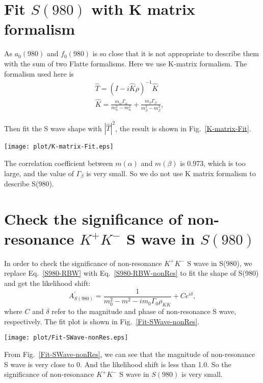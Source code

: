\section{Fit $S(980)$ with K matrix formalism}
\label{app:a0_f0_K_matrix}
{
    As $a_{0}(980)$ and $f_{0}(980)$ is so close that it is not appropriate to describe them with the sum of two Flatte formalisms.
    Here we use K-matrix formalism. 
    The formalism used here is
    \begin{equation}
        \begin{array}{lr}
            \hat{T} = (I - i\hat{K}\rho)^{-1} \hat{K}&\\
            \hat{K} = \frac{m_{\alpha}\Gamma_{\alpha}}{m_{\alpha}^{2} - m_{\alpha}^{2}} + \frac{m_{\beta}\Gamma_{\beta}}{m_{\beta}^{2} - m_{\beta}^{2}}, &
        \end{array}\label{K-matrix} 
    \end{equation}

    Then fit the S wave shape with $|\hat{T}|^{2}$, the result is shown in Fig.~\ref{K-matrix-Fit}.

    \begin{figure*}[htbp]
        \centering
        \texttt{[image: plot/K-matrix-Fit.eps]}
        \caption{Fit $S(980)$ with $|\hat{T}|^{2}$.}
        \label{K-matrix-Fit}
    \end{figure*}
    The correlation coefficient between $m(\alpha)$ and $m(\beta)$ is 0.973, which is too large, and the value of $\Gamma_{\beta}$ is very small.
    So we do not use K matrix formalism to describe S(980).
    
}

\section{Check the significance of non-resonance $K^{+}K^{-}$ S wave in $S(980)$}
\label{app:a0_f0_nonRes}
{
    In order to check the significance of non-resonance $K^{+}K^{-}$ S wave in S(980), we replace Eq.~\ref{S980-RBW} with Eq.~\ref{S980-RBW-nonRes} to fit the shape of S(980) and get the likelihood shift: 
    \begin{equation}
        A_{S(980)}^{'} = \frac{1}{m_{0}^{2} - m^{2} -im_{0}\Gamma_{0}\rho_{KK}} + Ce^{i\delta}, \label{S980-RBW-nonRes}
    \end{equation}
    where $C$ and $\delta$ refer to the magnitude and phase of non-resonance S wave, respectively.
    The fit plot is shown in Fig.~\ref{Fit-SWave-nonRes}.
    \begin{figure*}[htbp]
        \centering
        \texttt{[image: plot/Fit-SWave-nonRes.eps]}
        \caption{Fit $S(980)$ with $|A_{S(980)}^{'}|^{2}$.}
        \label{Fit-SWave-nonRes}
    \end{figure*}
    From Fig.~\ref{Fit-SWave-nonRes}, we can see that the magnitude of non-resonance S wave is very close to 0.
    And the likelihood shift is less than 1.0.
    So the significance of non-resonance $K^{+}K^{-}$ S wave in $S(980)$ is very small.
}
